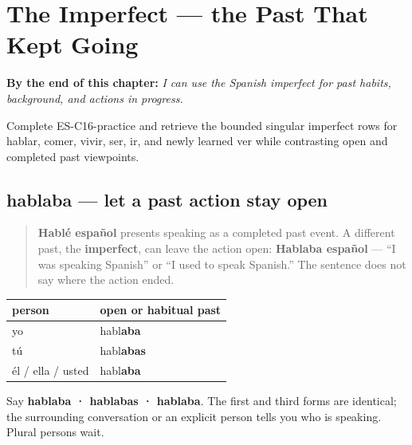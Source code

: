 
\chapter{The Imperfect --- the Past That Kept Going}
\label{ch:imperfect}

\begin{chapteropening}
\textbf{By the end of this chapter:} \emph{I can use the Spanish imperfect for past habits, background, and actions in progress.}

Complete ES-C16-practice and retrieve the bounded singular imperfect rows for hablar, comer, vivir, ser, ir, and newly learned ver while contrasting open and completed past viewpoints.
\end{chapteropening}

\section[hablaba]{hablaba — let a past action stay open}

\label{lesson:ES-C16-imperfecto}



\begin{quote}
\textbf{Hablé español} presents speaking as a completed past event. A different past, the \textbf{imperfect}, can leave the action open: \textbf{Hablaba español} — “I was speaking Spanish” or “I used to speak Spanish.” The sentence does not say where the action ended.
\end{quote}

\begin{grammarlens}[title={Grammar Lens: three familiar persons}]
\noindent
\begin{tabularx}{\linewidth}{@{}>{\raggedright\arraybackslash}X>{\raggedright\arraybackslash}X@{}}
\toprule
\textbf{person} & \textbf{open or habitual past} \\
\midrule
yo & habl\textbf{aba} \\
tú & habl\textbf{abas} \\
él / ella / usted & habl\textbf{aba} \\
\bottomrule
\end{tabularx}

Say \textbf{hablaba · hablabas · hablaba}. The first and third forms are identical; the surrounding conversation or an explicit person tells you who is speaking. Plural persons wait.
\end{grammarlens}


